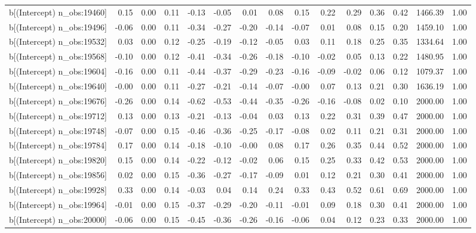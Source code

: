 \begin{table}[ht]
\begin{tabular}{rrrrrrrrrrrrrrr}
  b[(Intercept) n\_obs:19460] & 0.15 & 0.00 & 0.11 & -0.13 & -0.05 & 0.01 & 0.08 & 0.15 & 0.22 & 0.29 & 0.36 & 0.42 & 1466.39 & 1.00 \\ 
  b[(Intercept) n\_obs:19496] & -0.06 & 0.00 & 0.11 & -0.34 & -0.27 & -0.20 & -0.14 & -0.07 & 0.01 & 0.08 & 0.15 & 0.20 & 1459.10 & 1.00 \\ 
  b[(Intercept) n\_obs:19532] & 0.03 & 0.00 & 0.12 & -0.25 & -0.19 & -0.12 & -0.05 & 0.03 & 0.11 & 0.18 & 0.25 & 0.35 & 1334.64 & 1.00 \\ 
  b[(Intercept) n\_obs:19568] & -0.10 & 0.00 & 0.12 & -0.41 & -0.34 & -0.26 & -0.18 & -0.10 & -0.02 & 0.05 & 0.13 & 0.22 & 1480.95 & 1.00 \\ 
  b[(Intercept) n\_obs:19604] & -0.16 & 0.00 & 0.11 & -0.44 & -0.37 & -0.29 & -0.23 & -0.16 & -0.09 & -0.02 & 0.06 & 0.12 & 1079.37 & 1.00 \\ 
  b[(Intercept) n\_obs:19640] & -0.00 & 0.00 & 0.11 & -0.27 & -0.21 & -0.14 & -0.07 & -0.00 & 0.07 & 0.13 & 0.21 & 0.30 & 1636.19 & 1.00 \\ 
  b[(Intercept) n\_obs:19676] & -0.26 & 0.00 & 0.14 & -0.62 & -0.53 & -0.44 & -0.35 & -0.26 & -0.16 & -0.08 & 0.02 & 0.10 & 2000.00 & 1.00 \\ 
  b[(Intercept) n\_obs:19712] & 0.13 & 0.00 & 0.13 & -0.21 & -0.13 & -0.04 & 0.03 & 0.13 & 0.22 & 0.31 & 0.39 & 0.47 & 2000.00 & 1.00 \\ 
  b[(Intercept) n\_obs:19748] & -0.07 & 0.00 & 0.15 & -0.46 & -0.36 & -0.25 & -0.17 & -0.08 & 0.02 & 0.11 & 0.21 & 0.31 & 2000.00 & 1.00 \\ 
  b[(Intercept) n\_obs:19784] & 0.17 & 0.00 & 0.14 & -0.18 & -0.10 & -0.00 & 0.08 & 0.17 & 0.26 & 0.35 & 0.44 & 0.52 & 2000.00 & 1.00 \\ 
  b[(Intercept) n\_obs:19820] & 0.15 & 0.00 & 0.14 & -0.22 & -0.12 & -0.02 & 0.06 & 0.15 & 0.25 & 0.33 & 0.42 & 0.53 & 2000.00 & 1.00 \\ 
  b[(Intercept) n\_obs:19856] & 0.02 & 0.00 & 0.15 & -0.36 & -0.27 & -0.17 & -0.09 & 0.01 & 0.12 & 0.21 & 0.30 & 0.41 & 2000.00 & 1.00 \\ 
  b[(Intercept) n\_obs:19928] & 0.33 & 0.00 & 0.14 & -0.03 & 0.04 & 0.14 & 0.24 & 0.33 & 0.43 & 0.52 & 0.61 & 0.69 & 2000.00 & 1.00 \\ 
  b[(Intercept) n\_obs:19964] & -0.01 & 0.00 & 0.15 & -0.37 & -0.29 & -0.20 & -0.11 & -0.01 & 0.09 & 0.18 & 0.30 & 0.41 & 2000.00 & 1.00 \\ 
  b[(Intercept) n\_obs:20000] & -0.06 & 0.00 & 0.15 & -0.45 & -0.36 & -0.26 & -0.16 & -0.06 & 0.04 & 0.12 & 0.23 & 0.33 & 2000.00 & 1.00 \\ 

\end{tabular}
\end{table}
